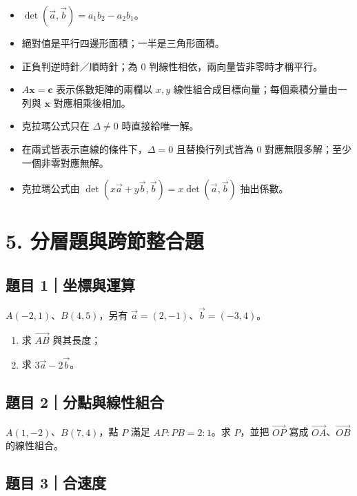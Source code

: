\documentclass[11pt,a4paper]{article}
\providecommand{\tightlist}{%
  \setlength{\itemsep}{0pt}\setlength{\parskip}{0pt}}
\begin{document}
\begin{itemize}
\tightlist
\item
  \(\det(\vec a,\vec b)=a_1b_2-a_2b_1\)。
\item
  絕對值是平行四邊形面積；一半是三角形面積。
\item
  正負判逆時針／順時針；為 \(0\) 判線性相依，兩向量皆非零時才稱平行。
\item
  \(A\mathbf{x}=\mathbf{c}\) 表示係數矩陣的兩欄以 \(x,y\) 線性組合成目標向量；每個乘積分量由一列與 \(\mathbf{x}\) 對應相乘後相加。
\item
  克拉瑪公式只在 \(\Delta\ne0\) 時直接給唯一解。
\item
  在兩式皆表示直線的條件下，\(\Delta=0\) 且替換行列式皆為 \(0\) 對應無限多解；至少一個非零對應無解。
\item
  克拉瑪公式由 \(\det(x\vec a+y\vec b,\vec b)=x\det(\vec a,\vec b)\) 抽出係數。
\end{itemize}

\section{5. 分層題與跨節整合題}\label{ux5206ux5c64ux984cux8207ux8de8ux7bc0ux6574ux5408ux984c}

\subsection{題目 1｜坐標與運算}\label{ux984cux76ee-1ux5750ux6a19ux8207ux904bux7b97}

\(A(-2,1)\)、\(B(4,5)\)，另有 \(\vec a=(2,-1)\)、\(\vec b=(-3,4)\)。

\begin{enumerate}
\def\labelenumi{\arabic{enumi}.}
\tightlist
\item
  求 \(\overrightarrow{AB}\) 與其長度；
\item
  求 \(3\vec a-2\vec b\)。
\end{enumerate}

\subsection{題目 2｜分點與線性組合}\label{ux984cux76ee-2ux5206ux9edeux8207ux7ddaux6027ux7d44ux5408}

\(A(1,-2)\)、\(B(7,4)\)，點 \(P\) 滿足 \(AP:PB=2:1\)。求 \(P\)，並把 \(\overrightarrow{OP}\) 寫成 \(\overrightarrow{OA}\)、\(\overrightarrow{OB}\) 的線性組合。

\subsection{題目 3｜合速度}\label{ux984cux76ee-3ux5408ux901fux5ea6}
\end{document}
